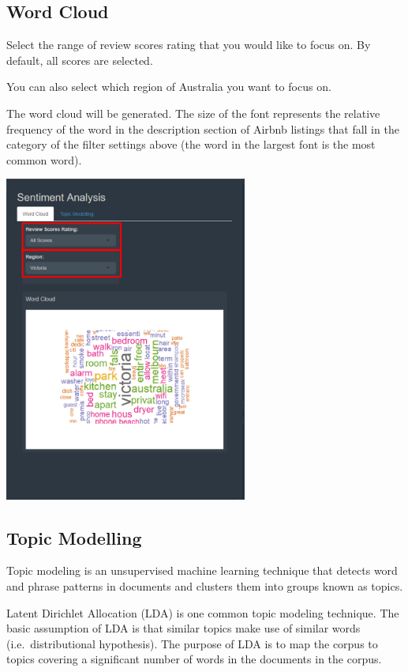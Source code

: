 \documentclass[
]{article}
\begin{document}
\hypertarget{word-cloud}{%
\subsection{Word Cloud}\label{word-cloud}}

Select the range of review scores rating that you would like to focus
on. By default, all scores are selected.

You can also select which region of Australia you want to focus on.

The word cloud will be generated. The size of the font represents the
relative frequency of the word in the description section of Airbnb
listings that fall in the category of the filter settings above (the
word in the largest font is the most common word).

\includegraphics[width=0.6\textwidth,height=\textheight]{images/wordcloud1.png}

\hypertarget{topic-modelling}{%
\subsection{Topic Modelling}\label{topic-modelling}}

Topic modeling is an unsupervised machine learning technique that
detects word and phrase patterns in documents and clusters them into
groups known as topics.

Latent Dirichlet Allocation (LDA) is one common topic modeling
technique. The basic assumption of LDA is that similar topics make use
of similar words (i.e.~distributional hypothesis). The purpose of LDA is
to map the corpus to topics covering a significant number of words in
the documents in the corpus.
\end{document}
